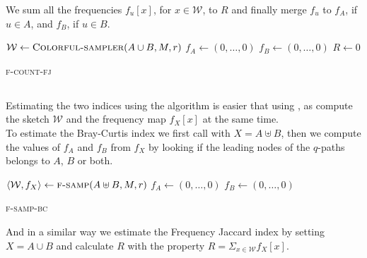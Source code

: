 We sum all the frequencies $f_u[x]$, for $x \in \mathcal{W}$, to $R$ and finally merge $f_{u}$ to $f_A$, if $u \in A$, and $f_B$, if $u \in B$.

\begin{algorithm}[h]
	\small
	\DontPrintSemicolon
	\BlankLine
	$\mathcal{W} \gets \textsc{Colorful-sampler}(A \cup B, M, r)$ \;
	$f_A \gets (0,\ldots,0)$\;
	$f_B \gets (0,\ldots,0)$\;
	$R \gets 0$\;
	\BlankLine
	\BlankLine
	\caption{\textsc{f-count-fj}}
	\label{alg:randomsample}
	\label{alg:sample}
\end{algorithm}

\subsection*{\fsamp}

Estimating the two indices using the \fsamp algorithm is easier that using \fcount, 
as \fsamp compute the sketch $\mathcal{W}$ and the frequency map $f_X[x]$ at the same time.\\

To estimate the Bray-Curtis index we first call \fsamp with $X = A \uplus B$, then 
we compute the values of $f_A$ and $f_B$ from $f_X$ by looking if the leading nodes of the $q$-paths belongs to $A$, $B$ or both.

\clearpage

\begin{algorithm}[h]
	\small
	\DontPrintSemicolon
	$\langle \mathcal{W}, f_X \rangle \gets \textsc{f-samp}(A \uplus B, M, r)$ \;
	$f_A \gets (0,\ldots,0)$\;
	$f_B \gets (0,\ldots,0)$\;
	\caption{\textsc{f-samp-bc}}
	\label{alg:randomsample}
	\label{alg:sample}
\end{algorithm}
And in a similar way we estimate the Frequency Jaccard index by setting $X = A \cup B$ and calculate $R$ with the property $R = \Sigma_{x \in \mathcal{W}}{f_X[x]}$.

